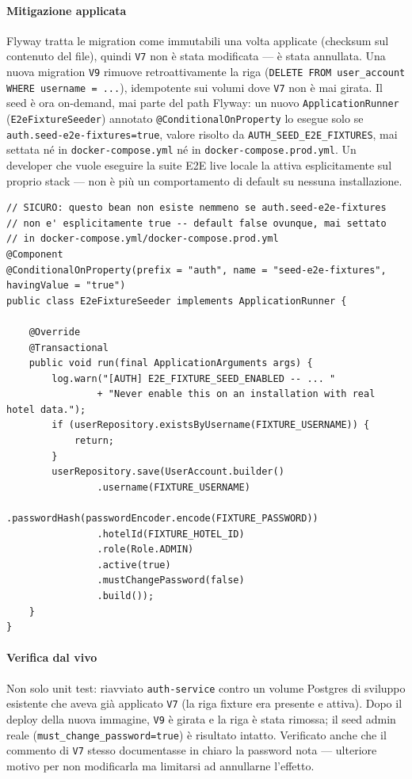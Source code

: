 ﻿\documentclass[a4paper,12pt]{report}
\begin{document}
\paragraph{Mitigazione applicata}
Flyway tratta le migration come immutabili una volta applicate (checksum
sul contenuto del file), quindi \texttt{V7} non è stata modificata --- è
stata annullata. Una nuova migration \texttt{V9} rimuove retroattivamente
la riga (\texttt{DELETE FROM user\_account WHERE username = ...}),
idempotente sui volumi dove \texttt{V7} non è mai girata. Il seed è ora
on-demand, mai parte del path Flyway: un nuovo \texttt{ApplicationRunner}
(\texttt{E2eFixtureSeeder}) annotato \texttt{@ConditionalOnProperty} lo
esegue solo se \texttt{auth.seed-e2e-fixtures=true}, valore risolto da
\texttt{AUTH\_SEED\_E2E\_FIXTURES}, mai settata né in
\texttt{docker-compose.yml} né in \texttt{docker-compose.prod.yml}. Un
developer che vuole eseguire la suite E2E live locale la attiva
esplicitamente sul proprio stack --- non è più un comportamento di
default su nessuna installazione.

\begin{securebox}[title={E2eFixtureSeeder.java --- seed opt-in, gated da env var (fix)}]
\begin{lstlisting}[style=java]
// SICURO: questo bean non esiste nemmeno se auth.seed-e2e-fixtures
// non e' esplicitamente true -- default false ovunque, mai settato
// in docker-compose.yml/docker-compose.prod.yml
@Component
@ConditionalOnProperty(prefix = "auth", name = "seed-e2e-fixtures", havingValue = "true")
public class E2eFixtureSeeder implements ApplicationRunner {

    @Override
    @Transactional
    public void run(final ApplicationArguments args) {
        log.warn("[AUTH] E2E_FIXTURE_SEED_ENABLED -- ... "
                + "Never enable this on an installation with real hotel data.");
        if (userRepository.existsByUsername(FIXTURE_USERNAME)) {
            return;
        }
        userRepository.save(UserAccount.builder()
                .username(FIXTURE_USERNAME)
                .passwordHash(passwordEncoder.encode(FIXTURE_PASSWORD))
                .hotelId(FIXTURE_HOTEL_ID)
                .role(Role.ADMIN)
                .active(true)
                .mustChangePassword(false)
                .build());
    }
}
\end{lstlisting}
\end{securebox}

\paragraph{Verifica dal vivo}
Non solo unit test: riavviato \texttt{auth-service} contro un volume
Postgres di sviluppo esistente che aveva già applicato \texttt{V7} (la riga
fixture era presente e attiva). Dopo il deploy della nuova immagine,
\texttt{V9} è girata e la riga è stata rimossa; il seed admin reale
(\texttt{must\_change\_password=true}) è risultato intatto. Verificato
anche che il commento di \texttt{V7} stesso documentasse in chiaro la
password nota --- ulteriore motivo per non modificarla ma limitarsi ad
annullarne l'effetto.
\end{document}
